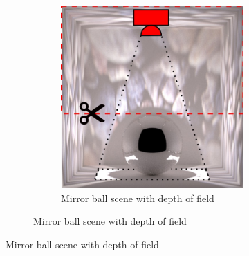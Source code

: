 \begin{figure}[]
    \centering    
    \begin{subfigure}{\textwidth}
        \centering
        \begin{subfigure}{0.5\textwidth}
            \centering
            \includegraphics[width=\textwidth]{images/04-experiment03/ball_dof/scene_highlighted.jpg}
            \caption*{Mirror ball scene with depth of field}
        \end{subfigure}


\end{subfigure}
\end{figure}
